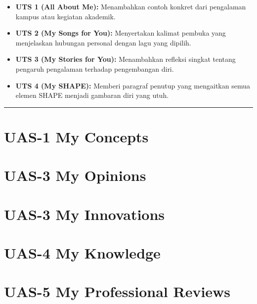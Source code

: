 \documentclass[
  letterpaper,
  DIV=11,
  numbers=noendperiod]{scrreprt}
\providecommand{\tightlist}{%
  \setlength{\itemsep}{0pt}\setlength{\parskip}{0pt}}
\begin{document}
\begin{itemize}
\tightlist
\item
  \textbf{UTS 1 (All About Me):} Menambahkan contoh konkret dari
  pengalaman kampus atau kegiatan akademik.\\
\item
  \textbf{UTS 2 (My Songs for You):} Menyertakan kalimat pembuka yang
  menjelaskan hubungan personal dengan lagu yang dipilih.\\
\item
  \textbf{UTS 3 (My Stories for You):} Menambahkan refleksi singkat
  tentang pengaruh pengalaman terhadap pengembangan diri.\\
\item
  \textbf{UTS 4 (My SHAPE):} Memberi paragraf penutup yang mengaitkan
  semua elemen SHAPE menjadi gambaran diri yang utuh.
\end{itemize}

\begin{center}\rule{0.5\linewidth}{0.5pt}\end{center}


\chapter{UAS-1 My Concepts}\label{uas-1-my-concepts}


\chapter{UAS-3 My Opinions}\label{uas-3-my-opinions}


\chapter{UAS-3 My Innovations}\label{uas-3-my-innovations}


\chapter{UAS-4 My Knowledge}\label{uas-4-my-knowledge}


\chapter{UAS-5 My Professional
Reviews}\label{uas-5-my-professional-reviews}
\end{document}
